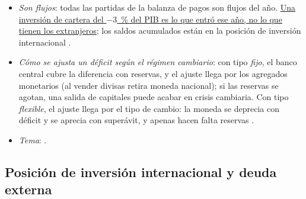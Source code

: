 \documentclass[11pt]{article}
\begin{document}
\begin{itemize}
  \begin{itemize}
  \item \emph{Cómo se leen en el cuadro}: la inversión directa, junto a la inversión interna (¿financia nueva capacidad o compra empresas existentes?); la de cartera, junto a la bolsa y los tipos de interés.
  \item \emph{La paridad de intereses con prima de riesgo}: el capital va donde el rendimiento esperado, corregido por la depreciación esperada y por una prima de riesgo, es mayor. Si un país paga tipos altos y su moneda parece estable, atrae capital a corto plazo prestado en monedas de tipos bajos (\emph{carry trade}), que sale en cuanto cambian las expectativas.
  \item \emph{Factores de empuje y de atracción}: las entradas dependen de lo que pasa \textbf{fuera} (tipos bajos en las economías avanzadas, apetito por el riesgo, contagio, ventas forzosas de los inversores) tanto como de lo que pasa \textbf{dentro} (mejora de la calificación, estabilización, reformas) \parencite{CalvoLeidermanReinhart1993}. Por eso los emergentes tienen poca autonomía aunque floten: las decisiones de la Reserva Federal mueven sus tipos, sus flujos y sus monedas (el \emph{ciclo financiero mundial}) \parencite{Rey2013Dilema}.
  \end{itemize}
\item \emph{Son flujos}: todas las partidas de la balanza de pagos son flujos del año. \uline{Una inversión de cartera del $-3$~\% del PIB es lo que entró ese año, no lo que tienen los extranjeros}; los saldos acumulados están en la posición de inversión internacional \parencite{FMI2009MBP6}.
\item \emph{Cómo se ajusta un déficit según el régimen cambiario}: con tipo \emph{fijo}, el banco central cubre la diferencia con reservas, y el ajuste llega por los agregados monetarios (al vender divisas retira moneda nacional); si las reservas se agotan, una salida de capitales puede acabar en crisis cambiaria. Con tipo \emph{flexible}, el ajuste llega por el tipo de cambio: la moneda se deprecia con déficit y se aprecia con superávit, y apenas hacen falta reservas \parencite{KrugmanObstfeldMelitz2018} .
\item \emph{Tema}:   .
\end{itemize}

\subsection{Posición de inversión internacional y deuda externa}\label{sec:piin}
\end{document}
